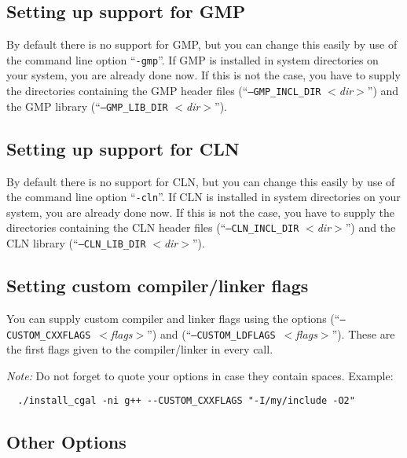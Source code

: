 \subsection{Setting up support for GMP}\label{sec:gmp-setup}

By default there is no support for GMP, but you can change this easily
by use of the command line option ``\texttt{-gmp}''. If GMP is
installed in system directories on your system, you are already done
now. If this is not the case, you have to supply the directories
containing the GMP header files (``\texttt{--GMP\_INCL\_DIR}
\textit{$<$dir$>$}'') and the GMP library
(``\texttt{--GMP\_LIB\_DIR}
\textit{$<$dir$>$}'').

\subsection{Setting up support for CLN}\label{sec:cln-setup}

By default there is no support for CLN, but you can change this easily
by use of the command line option ``\texttt{-cln}''. If CLN is
installed in system directories on your system, you are already done
now. If this is not the case, you have to supply the directories
containing the CLN header files (``\texttt{--CLN\_INCL\_DIR}
\textit{$<$dir$>$}'') and the CLN library
(``\texttt{--CLN\_LIB\_DIR}
\textit{$<$dir$>$}'').

\subsection{Setting custom compiler/linker flags}\label{sec:custom-setup}

You can supply custom compiler and linker flags using the options
\mbox{(``\texttt{--CUSTOM\_CXXFLAGS}
  \textit{$<$flags$>$}'')} and
\mbox{(``\texttt{--CUSTOM\_LDFLAGS}
  \textit{$<$flags$>$}'')}.  These are the
first flags given to the compiler/linker in every call.

\textit{Note:} Do not forget to quote your options in case they
contain spaces. Example:
\begin{verbatim}
  ./install_cgal -ni g++ --CUSTOM_CXXFLAGS "-I/my/include -O2"
\end{verbatim}

\subsection{Other Options}\label{sec:other-options}

